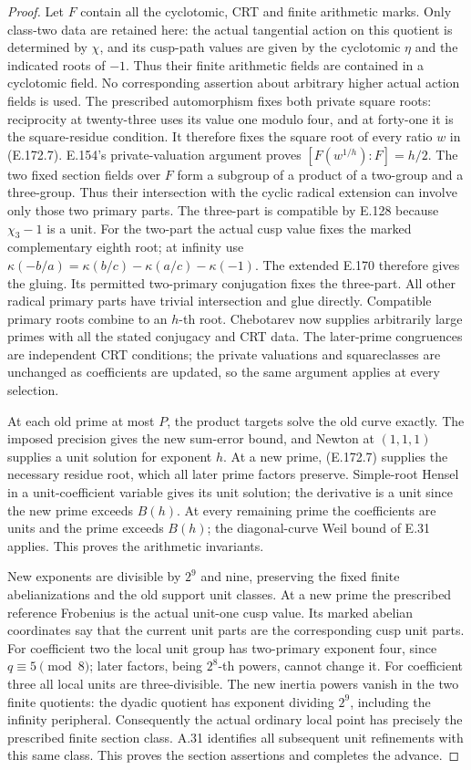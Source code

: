 \begin{proof}
Let \(F\) contain all the cyclotomic, CRT and finite arithmetic
marks. Only class-two data are retained here: the actual
tangential action on this quotient is determined by \(\chi\),
and its cusp-path values are given by the cyclotomic \(\eta\)
and the indicated roots of \(-1\). Thus their finite arithmetic
fields are contained in a cyclotomic field. No corresponding
assertion about arbitrary higher actual action fields is used.
The prescribed automorphism fixes both private square
roots: reciprocity at twenty-three uses its value one modulo
four, and at forty-one it is the square-residue condition.
It therefore fixes the square root of every ratio \(w\) in
(E.172.7). E.154's private-valuation argument proves
\([F(w^{1/h}):F]=h/2\).
The two fixed section fields over \(F\) form a subgroup of a
product of a two-group and a three-group. Thus their intersection
with the cyclic radical extension can involve only those two
primary parts. The three-part is compatible by E.128 because
\(\chi_3-1\) is a unit. For the two-part the actual cusp value
fixes the marked complementary eighth root; at infinity use
\(\kappa(-b/a)=\kappa(b/c)-\kappa(a/c)-\kappa(-1)\).
The extended E.170 therefore gives the gluing. Its permitted
two-primary conjugation fixes the three-part. All other radical
primary parts have trivial intersection and glue directly.
Compatible primary roots combine to an \(h\)-th root.
Chebotarev now supplies arbitrarily large primes with all the
stated conjugacy and CRT data. The later-prime congruences are
independent CRT conditions; the private valuations and squareclasses
are unchanged as coefficients are updated, so the same argument
applies at every selection.

At each old prime at most \(P\), the product targets solve the
old curve exactly. The imposed precision gives the new sum-error
bound, and Newton at \((1,1,1)\) supplies a unit solution for
exponent \(h\). At a new prime, (E.172.7) supplies the necessary
residue root, which all later prime factors preserve. Simple-root
Hensel in a unit-coefficient variable gives its unit solution;
the derivative is a unit since the new prime exceeds \(B(h)\).
At every remaining prime the coefficients are units and the prime
exceeds \(B(h)\); the diagonal-curve Weil bound of E.31 applies.
This proves the arithmetic invariants.

New exponents are divisible by \(2^9\) and nine, preserving the
fixed finite abelianizations and the old support unit classes.
At a new prime the prescribed reference Frobenius is the actual
unit-one cusp value. Its marked abelian coordinates say that the
current unit parts are the corresponding cusp unit parts.
For coefficient two the local unit group has two-primary exponent
four, since \(q\equiv5\pmod8\); later factors, being
\(2^8\)-th powers, cannot change it. For coefficient three all
local units are three-divisible. The new inertia powers vanish
in the two finite quotients: the dyadic quotient has exponent
dividing \(2^9\), including the infinity peripheral.
Consequently the actual ordinary local point has precisely the
prescribed finite section class. A.31 identifies all subsequent
unit refinements with this same class. This proves the section
assertions and completes the advance.
\end{proof}

